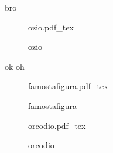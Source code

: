 \documentclass{article}
\date{12 Gennaio 2019}
\newcommand{\incfig}[2][1]{%
    \def\svgwidth{#1\columnwidth}
    {#2.pdf_tex}
}
\begin{document}
bro
\begin{figure}[ht]
    \centering
    \incfig{ozio}
    \caption{ozio}
    \label{fig:ozio}
\end{figure}
ok
oh
\begin{figure}[ht]
    \centering
    \incfig{famostafigura}
    \caption{famostafigura}
    \label{fig:famostafigura}
\end{figure}
\begin{figure}[ht]
    \centering
    \incfig{orcodio}
    \caption{orcodio}
    \label{fig:orcodio}
\end{figure}
\end{document}
